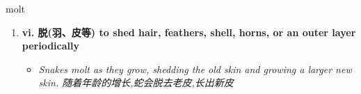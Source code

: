 
\begin{frame}
{\huge molt}
\begin{center}
\begin{enumerate}\Large
  \item \textbf{vi. 脱(羽、皮等) to shed hair, feathers, shell, horns, or an outer layer periodically}
  \begin{itemize}
    \item \em{\Large{Snakes molt as they grow, shedding the old skin and growing a larger new skin. 随着年龄的增长,蛇会脱去老皮,长出新皮}}
  \end{itemize}
\end{enumerate}
\end{center}
\end{frame}
